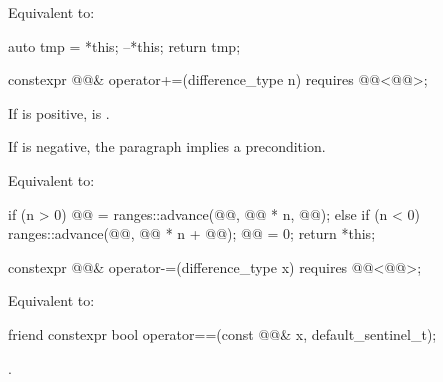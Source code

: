 \begin{itemdescr}
\pnum
\effects
Equivalent to:
\begin{codeblock}
auto tmp = *this;
--*this;
return tmp;
\end{codeblock}
\end{itemdescr}

%
\begin{itemdecl}
constexpr @@& operator+=(difference_type n) requires @@<@@>;
\end{itemdecl}

\begin{itemdescr}
\pnum
\expects
If  is positive,
is .
\begin{note}
If  is negative, the  paragraph implies a precondition.
\end{note}

\pnum
\effects
Equivalent to:
\begin{codeblock}
if (n > 0) {
  @@ = ranges::advance(@@, @@ * n, @@);
} else if (n < 0) {
  ranges::advance(@@, @@ * n + @@);
  @@ = 0;
}
return *this;
\end{codeblock}
\end{itemdescr}

%
\begin{itemdecl}
constexpr @@& operator-=(difference_type x)
  requires @@<@@>;
\end{itemdecl}

\begin{itemdescr}
\pnum
\effects
Equivalent to: 
\end{itemdescr}

%
\begin{itemdecl}
friend constexpr bool operator==(const @@& x, default_sentinel_t);
\end{itemdecl}

\begin{itemdescr}
\pnum
\returns
{}.
\end{itemdescr}

